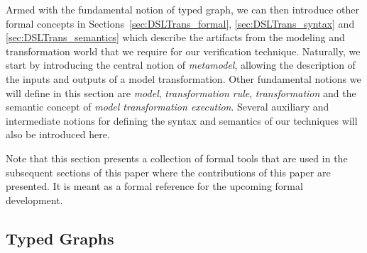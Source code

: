 

Armed with the fundamental notion of typed graph, we can then introduce other formal concepts in Sections~\ref{sec:DSLTrans_formal}, \ref{sec:DSLTrans_syntax} and \ref{sec:DSLTrans_semantics} which describe the artifacts from the modeling and transformation world that we require for our verification technique. Naturally, we start by introducing the central notion of \emph{metamodel}, allowing the description of the inputs and outputs of a model transformation. Other fundamental notions we will define in this section are \emph{model}, \emph{transformation rule}, \emph{transformation} and the semantic concept of \emph{model transformation execution}. Several auxiliary and intermediate notions for defining the syntax and semantics of our techniques will also be introduced here. 

Note that this section presents a collection of formal tools that are used in the subsequent sections of this paper where the contributions of this paper are presented. It is meant as a formal reference for the upcoming formal development. %



\newcommand{\defineggprime}{Let $\langle V,E,(s,t),\tau,VT,ET\rangle = g$, and\\ $\langle V',E',(s',t'),\tau',VT',ET'\rangle = g'$, where $g, g' \in \textsc{TG}$.}

\newcommand{\ET}{\mathit{ET}}
\newcommand{\VT}{\mathit{VT}}



\subsection{Typed Graphs}
\label{subsec:typed_graphs}


